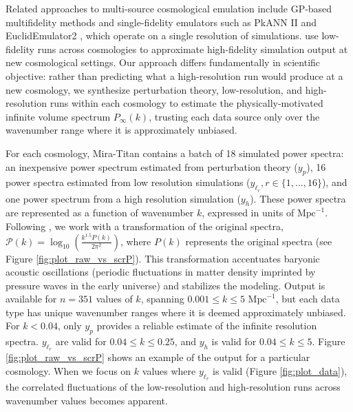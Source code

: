 \documentclass[11pt]{article}
\begin{document}
Related approaches to multi-source cosmological emulation include GP-based 
multifidelity methods \citep{ho2022multifidelity, ho2023mfbox} and single-fidelity 
emulators such as PkANN II \citep{agarwal2014pkannII} and EuclidEmulator2 
\citep{euclid2021euclid}, which operate on a single resolution of simulations. 
\cite{ho2022multifidelity,ho2023mfbox} use low-fidelity runs across cosmologies 
to approximate high-fidelity simulation output at new cosmological settings. 
Our approach differs fundamentally in scientific objective: rather than predicting 
what a high-resolution run would produce at a new cosmology, we synthesize 
perturbation theory, low-resolution, and high-resolution runs within each cosmology 
to estimate the physically-motivated infinite volume spectrum $P_\infty(k)$, 
trusting each data source only over the wavenumber range where it is approximately unbiased.

For each cosmology, Mira-Titan contains a batch of 18 simulated power spectra: an inexpensive 
power spectrum estimated from perturbation theory ($y_p$), 16 power spectra estimated from 
low resolution simulations ($y_{\ell_r}, r \in \{1,\dots,16\}$), and one power spectrum from 
a high resolution simulation ($y_h$). 
These power spectra are represented as a function of wavenumber $k$, expressed in units of 
$\text{Mpc}^{-1}$.  Following 
\cite{moran2023mira}, we work with a transformation of the original spectra,
$\mathcal{P}(k)=\log_{10}\left(\frac{k^{1.5}P(k)}{2\pi^2}\right)$, where $P(k)$ represents the
original spectra (see  Figure \ref{fig:plot_raw_vs_scrP}). This transformation accentuates 
baryonic acoustic oscillations (periodic fluctuations in matter density imprinted by 
pressure waves in the early universe) and stabilizes the modeling. Output is available 
for $n=351$ values of $k$, spanning $0.001 \leq k \leq 5 \text{ Mpc}^{-1}$, 
but each data type has unique wavenumber ranges where it is deemed approximately unbiased. 
For $k<0.04$, only $y_p$ provides a reliable estimate of the infinite resolution spectra. 
$y_{\ell_r}$ are valid for $0.04 \leq k \leq 0.25$, and $y_h$ is valid for $0.04 \leq k \leq 5$.  
Figure \ref{fig:plot_raw_vs_scrP} shows an example of the output for a particular cosmology. 
When we focus on $k$ values where $y_{\ell_r}$ is valid (Figure \ref{fig:plot_data}), 
the correlated fluctuations of the low-resolution and high-resolution runs across 
wavenumber values becomes apparent.
\end{document}
